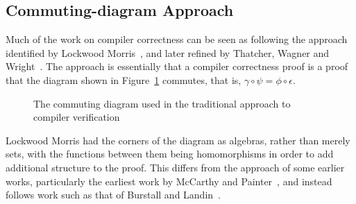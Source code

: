 \subsection{Commuting-diagram Approach}
\label{commuting-diagram-subsection}

Much of the work on compiler correctness can be seen as following the
approach identified by Lockwood Morris~\cite{morris1973}, and later
refined by Thatcher, Wagner and Wright~\cite{thatcher1979}.
The approach is essentially that a compiler correctness proof is a
proof that the diagram shown in Figure~\ref{commuting-diagram}
commutes, that is, $\gamma \circ \psi = \phi \circ \epsilon$.

\begin{figure}[ht]
  \begin{center}
  \end{center}
  \caption{The commuting diagram used in the traditional approach to
    compiler verification}
  \label{commuting-diagram}
\end{figure}

Lockwood Morris had the corners of the diagram as algebras, rather
than merely sets, with the functions between them being homomorphisms
in order to add additional structure to the proof.
This differs from the approach of some earlier works, particularly the
earliest work by McCarthy and Painter~\cite{mccarthy1967}, and instead
follows work such as that of Burstall and Landin~\cite{burstall1969}.

